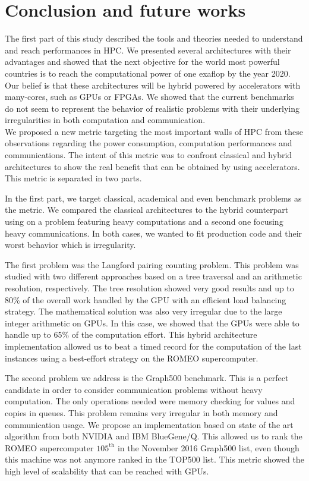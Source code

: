 \chapter*{Conclusion and future works}
The first part of this study described the tools and theories needed to understand and reach performances in HPC. 
We presented several architectures with their advantages and showed that the next objective for the world most powerful countries is to reach the computational power of one exaflop by the year 2020. 
Our belief is that these architectures will be hybrid powered by accelerators with many-cores, such as GPUs or FPGAs. 
We showed that the current benchmarks do not seem to represent the behavior of realistic problems with their underlying irregularities in both computation and communication.\\

We proposed a new metric targeting the most important walls of HPC from these observations regarding the power consumption, computation performances and communications.
The intent of this metric was to confront classical and hybrid architectures to show the real benefit that can be obtained by using accelerators. 
This metric is separated in two parts. 

In the first part, we target classical, academical and even benchmark problems as the metric. 
We compared the classical architectures to the hybrid counterpart using on a problem featuring heavy computations and a second one focusing heavy communications. 
In both cases, we wanted to fit production code and their worst behavior which is irregularity. 

The first problem was the Langford pairing counting problem. 
This problem was studied with two different approaches based on a tree traversal and an arithmetic resolution, respectively. 
The tree resolution showed very good results and up to 80\% of the overall work handled by the GPU with an efficient load balancing strategy. 
The mathematical solution was also very irregular due to the large integer arithmetic on GPUs. 
In this case, we showed that the GPUs were able to handle up to 65\% of the computation effort. 
This hybrid architecture implementation allowed us to beat a timed record for the computation of the last instances using a best-effort strategy on the ROMEO supercomputer. 

The second problem we address is the Graph500 benchmark. 
This is a perfect candidate in order to consider communication problems without heavy computation. 
The only operations needed were memory checking for values and copies in queues. 
This problem remains very irregular in both memory and communication usage. 
We propose an implementation based on state of the art algorithm from both NVIDIA and IBM BlueGene/Q. 
This allowed us to rank the ROMEO supercomputer $105^{\text{th}}$ in the November 2016 Graph500 list, even though this machine was not anymore ranked in the TOP500 list. 
This metric showed the high level of scalability that can be reached with GPUs.\\

